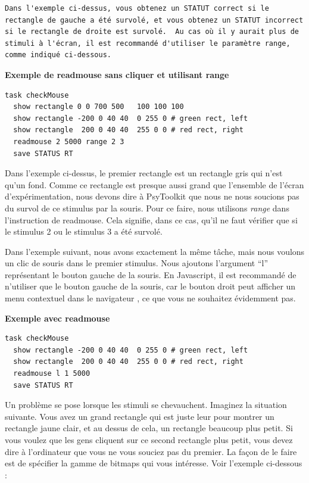 \documentclass[
]{book}
\begin{document}
\begin{verbatim}
Dans l'exemple ci-dessus, vous obtenez un STATUT correct si le rectangle de gauche a été survolé, et vous obtenez un STATUT incorrect si le rectangle de droite est survolé.  Au cas où il y aurait plus de stimuli à l'écran, il est recommandé d'utiliser le paramètre range, comme indiqué ci-dessous.
\end{verbatim}

\textbf{Exemple de readmouse sans cliquer et utilisant range}

\begin{verbatim}
task checkMouse
  show rectangle 0 0 700 500   100 100 100
  show rectangle -200 0 40 40  0 255 0 # green rect, left
  show rectangle  200 0 40 40  255 0 0 # red rect, right
  readmouse 2 5000 range 2 3
  save STATUS RT
\end{verbatim}

Dans l'exemple ci-dessus, le premier rectangle est un rectangle gris qui
n'est qu'un fond. Comme ce rectangle est presque aussi grand que
l'ensemble de l'écran d'expérimentation, nous devons dire à PsyToolkit
que nous ne nous soucions pas du survol de ce stimulus par la souris.
Pour ce faire, nous utilisons \emph{range} dans l'instruction de
readmouse. Cela signifie, dans ce cas, qu'il ne faut vérifier que si le
stimulus 2 ou le stimulus 3 a été survolé.

Dans l'exemple suivant, nous avons exactement la même tâche, mais nous
voulons un clic de souris dans le premier stimulus. Nous ajoutons
l'argument ``l'' représentant le bouton gauche de la souris. En
Javascript, il est recommandé de n'utiliser que le bouton gauche de la
souris, car le bouton droit peut afficher un menu contextuel dans le
navigateur , ce que vous ne souhaitez évidemment pas.

\textbf{Exemple avec readmouse}

\begin{verbatim}
task checkMouse
  show rectangle -200 0 40 40  0 255 0 # green rect, left
  show rectangle  200 0 40 40  255 0 0 # red rect, right
  readmouse l 1 5000
  save STATUS RT
\end{verbatim}

Un problème se pose lorsque les stimuli se chevauchent. Imaginez la
situation suivante. Vous avez un grand rectangle qui est juste leur pour
montrer un rectangle jaune clair, et au dessus de cela, un rectangle
beaucoup plus petit. Si vous voulez que les gens cliquent sur ce second
rectangle plus petit, vous devez dire à l'ordinateur que vous ne vous
souciez pas du premier. La façon de le faire est de spécifier la gamme
de bitmaps qui vous intéresse. Voir l'exemple ci-dessous :
\end{document}
